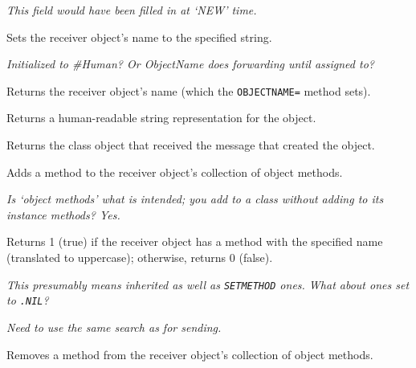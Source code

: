 

\emph{This field would have been filled in at `NEW' time.}



Sets the receiver object's name to the specified string.



\emph{Initialized to \#Human? Or ObjectName does forwarding until
assigned to?}



Returns the receiver object's name (which the \texttt{OBJECTNAME=}
method sets).



Returns a human-readable string representation for the object.



Returns the class object that received the message that created the
object.



Adds a method to the receiver object's collection of object methods.

\emph{Is `object methods' what is intended; you add to a class without
adding to its instance methods? Yes.}



Returns 1 (true) if the receiver object has a method with the specified
name (translated to uppercase); otherwise, returns 0 (false).

\emph{This presumably means inherited as well as \texttt{SETMETHOD}
ones. What about ones set to \texttt{.NIL}?}

\emph{Need to use the same search as for sending.}



Removes a method from the receiver object's collection of object
methods.

